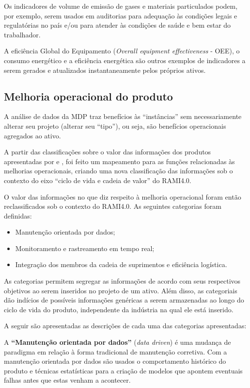 Os indicadores de volume de emissão de gases e materiais particulados podem, por exemplo, serem usados em auditorias para adequação às condições legais e regulatórias no país e/ou para atender às condições de saúde e bem estar do trabalhador.

A eficiência Global do Equipamento (\textit{Overall equipment effectiveness} - OEE), o consumo energético e a eficiência energética são outros exemplos de indicadores a serem gerados e atualizados instantaneamente pelos próprios ativos.

\subsection{Melhoria operacional do produto}
\label{sec:melhoria-operacional}

A análise de dados da MDP traz benefícios às ``instâncias'' sem necessariamente alterar seu projeto (alterar seu ``tipo''), ou seja, são benefícios operacionais agregados ao ativo.

A partir das classificações sobre o valor das informações dos produtos apresentadas por  e , foi feito um mapeamento para as funções relacionadas às melhorias operacionais, criando uma nova classificação das informações sob o contexto do eixo ``ciclo de vida e cadeia de valor'' do RAMI4.0.

O valor das informações no que diz respeito à melhoria operacional foram então reclassificados sob o contexto do RAMI4.0. As seguintes categorias foram definidas:

\begin{itemize}
	\item Manutenção orientada por dados;
	\item Monitoramento e rastreamento em tempo real;
	\item Integração dos membros da cadeia de suprimentos e eficiência logística.
\end{itemize}

As categorias permitem segregar as informações de acordo com seus respectivos objetivos ao serem inseridos no projeto de um ativo. Além disso, as categoriais dão indícios de possíveis informações genéricas a serem armazenadas ao longo do ciclo de vida do produto, independente da indústria na qual ele está inserido.

A seguir são apresentadas as descrições de cada uma das categorias apresentadas:

A \textbf{``Manutenção orientada por dados''} (\textit{data driven}) é uma mudança de paradigma em relação à forma tradicional de manutenção corretiva. Com a manutenção orientada por dados são usados o comportamento histórico do produto e técnicas estatísticas para a criação de modelos que apontem eventuais falhas antes que estas venham a acontecer.

